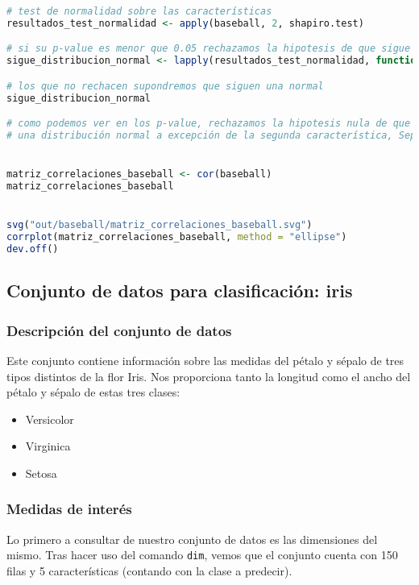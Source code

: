 \begin{lstlisting}[language=R]
# test de normalidad sobre las características
resultados_test_normalidad <- apply(baseball, 2, shapiro.test)

# si su p-value es menor que 0.05 rechazamos la hipotesis de que sigue una distribución normal
sigue_distribucion_normal <- lapply(resultados_test_normalidad, function(x) x$p.value > 0.05)

# los que no rechacen supondremos que siguen una normal
sigue_distribucion_normal

# como podemos ver en los p-value, rechazamos la hipotesis nula de que los datos siguen
# una distribución normal a excepción de la segunda característica, SepalWidth ,por muy poco


matriz_correlaciones_baseball <- cor(baseball)
matriz_correlaciones_baseball


svg("out/baseball/matriz_correlaciones_baseball.svg")
corrplot(matriz_correlaciones_baseball, method = "ellipse")
dev.off()
\end{lstlisting}

\subsection{Conjunto de datos para clasificación: iris}

\subsubsection{Descripción del conjunto de datos}

Este conjunto contiene información sobre las medidas del pétalo y sépalo de tres tipos distintos de la flor Iris. Nos proporciona tanto la longitud como el ancho del pétalo y sépalo de estas tres clases:

\begin{itemize}
	\item Versicolor
	\item Virginica
	\item Setosa
\end{itemize}

\subsubsection{Medidas de interés}

Lo primero a consultar de nuestro conjunto de datos es las dimensiones del mismo. Tras hacer uso del comando \texttt{dim}, vemos que el conjunto cuenta con 150 filas y 5 características (contando con la clase a predecir).


